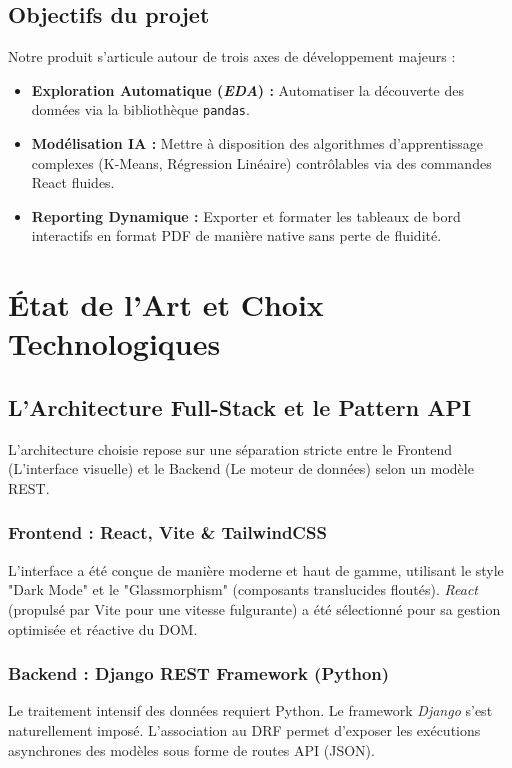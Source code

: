 \documentclass[12pt, a4paper]{report}
\begin{document}
\section{Objectifs du projet}
Notre produit s'articule autour de trois axes de développement majeurs :
\begin{itemize}
    \item \textbf{Exploration Automatique (\textit{EDA}) :} Automatiser la découverte des données via la bibliothèque \texttt{pandas}.
    \item \textbf{Modélisation IA :} Mettre à disposition des algorithmes d'apprentissage complexes (K-Means, Régression Linéaire) contrôlables via des commandes React fluides.
    \item \textbf{Reporting Dynamique :} Exporter et formater les tableaux de bord interactifs en format PDF de manière native sans perte de fluidité.
\end{itemize}
\lipsum[19-28]

\chapter{État de l'Art et Choix Technologiques}
\section{L'Architecture Full-Stack et le Pattern API}
L'architecture choisie repose sur une séparation stricte entre le Frontend (L'interface visuelle) et le Backend (Le moteur de données) selon un modèle REST.
\lipsum[29-38]

\subsection{Frontend : React, Vite \& TailwindCSS}
L'interface a été conçue de manière moderne et haut de gamme, utilisant le style "Dark Mode" et le "Glassmorphism" (composants translucides floutés). \textit{React} (propulsé par Vite pour une vitesse fulgurante) a été sélectionné pour sa gestion optimisée et réactive du DOM.
\lipsum[39-44]

\subsection{Backend : Django REST Framework (Python)}
Le traitement intensif des données requiert Python. Le framework \textit{Django} s'est naturellement imposé. L'association au DRF permet d'exposer les exécutions asynchrones des modèles sous forme de routes API (JSON).
\lipsum[45-52]
\end{document}
